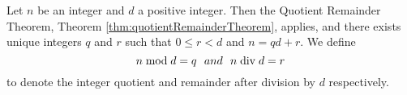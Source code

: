 \guard



\begin{defn}
\label{defn:mod}
\label{defn:div}
  Let $n$ be an integer and $d$ a positive integer.
  Then the Quotient Remainder Theorem, Theorem \ref{thm:quotientRemainderTheorem}, applies, and there exists unique integers $q$ and $r$ such that $0\leq r<d$ and $n=qd+r$.
  We define \[n\bmod d = q\text~~{ and }~~n\bdiv d = r\] to denote the integer quotient and remainder after division by $d$ respectively.
\end{defn}
